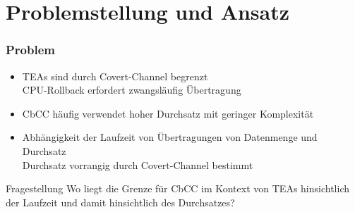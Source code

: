 
\section{Problemstellung und Ansatz}

\begin{frame}
    \frametitle{Problem}

    \begin{itemize}
        \item \acp{TEA} sind durch Covert-Channel begrenzt\\
        \textrightarrow\space \ac{CPU}-Rollback erfordert zwangsläufig Übertragung
        \item \ac{CbCC} häufig verwendet \cite[23]{xiong_survey_2022} \textrightarrow\space hoher Durchsatz mit geringer Komplexität
        \item Abhängigkeit der Laufzeit von Übertragungen von Datenmenge und Durchsatz\\
        \textrightarrow\space Durchsatz vorrangig durch Covert-Channel bestimmt
    \end{itemize}

    \pause
    \vspace{0.5cm}

    \begin{block}{Fragestellung}
        Wo liegt die Grenze für \ac{CbCC} im Kontext von \acp{TEA}
        hinsichtlich der Laufzeit und damit hinsichtlich des Durchsatzes?
    \end{block}

\end{frame}

